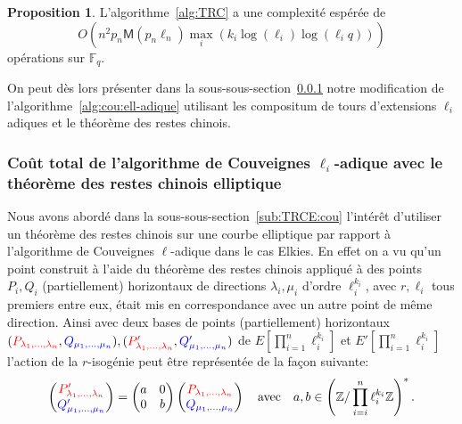 \documentclass[10pt,a4paper]{book}
\theoremstyle{plain}
\theoremstyle{definition}
\theoremstyle{definition}
\theoremstyle{definition}
\newtheorem{prop}[thm]{Proposition}
\theoremstyle{definition}
\theoremstyle{remark}
\theoremstyle{remark}
\theoremstyle{definition}
\begin{document}
\begin{prop}
L'algorithme~\ref{alg:TRC} a une complexité espérée de 
\[
O(n^2 p_{n}\mathsf{M}(p_{n}\ell_{n})\max_i(k_i\log(\ell_{i})\log(\ell_{i}q))) 
\]
opérations sur $\mathbb{F}_q$.
\end{prop}

On peut dès lors présenter dans la sous-sous-section~\ref{sss:crt:cou} notre 
modification de l'algorithme~\ref{alg:cou:ell-adique} utilisant les compositum 
de tours d'extensions $\ell_i$ adiques et le théorème des restes chinois.

\subsubsection{Coût total de l'algorithme de Couveignes $\ell_i$-adique avec le théorème des restes chinois elliptique}
\label{sss:crt:cou}
Nous avons abordé dans la sous-sous-section~\ref{sub:TRCE:cou} l'intérêt 
d'utiliser un théorème des restes chinois sur une courbe elliptique par rapport
à l'algorithme de Couveignes $\ell$-adique dans le cas Elkies. En effet on a vu
qu'un point construit à l'aide du théorème des restes chinois appliqué à des 
points $P_i,Q_i$ (partiellement) horizontaux de directions $\lambda_i,\mu_i$  
d'ordre $\ell_i^{k_i}$, avec $r, \ell_i$ tous premiers entre eux, 
était mis en correspondance avec un autre point de même direction.
Ainsi avec deux bases de points (partiellement) horizontaux $(\color{red}P_{\lambda_1,
 \dots, \lambda_n}\color{black},\color{blue}Q_{\mu_1, \dots, 
 \mu_n}\color{black}),(\color{red}P'_{\lambda_1, \dots, \lambda_n}\color{black}
 ,\color{blue}
 Q'_{\mu_1, \dots, \mu_n}\color{black})$ de $E[\prod_{i=1}^n\ell_i^{k_i}]$ et 
 $E'[\prod_{i=1}^n\ell_i^{k_i}]$ l'action de la $r$-isogénie peut être 
 représentée de la façon suivante:  
 \begin{equation*}
\left(
\begin{matrix}
\color{red} P'_{\lambda_1,
 \dots, \lambda_n} \\
\color{blue} Q'_{\mu_1, \dots, 
 \mu_n} \color{black}
\end{matrix}
\right)= \left(\begin{matrix}
a & 0 \\
0 & b
\end{matrix} \right)
\left(
\begin{matrix}
\color{red} P_{\lambda_1, 
\dots, \lambda_n} \\
\color{blue} Q_{\mu_1, \dots, 
 \mu_n} \color{black}
\end{matrix}
\right)
\quad \text{avec} \quad a,b \in \left( \mathbb{Z}/\prod_{i=i}^n\ell_i^{k_i}\mathbb{Z} \right)^*.
\end{equation*}
 
\end{document}
